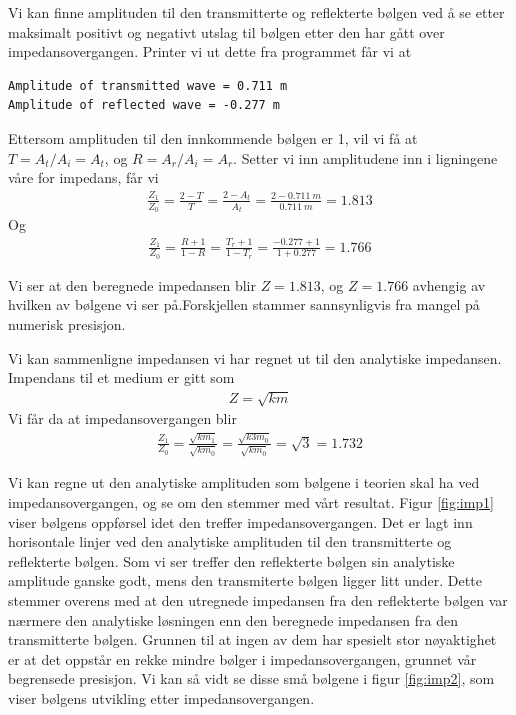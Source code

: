 \documentclass[12p,a4paper]{report}
\begin{document}
Vi kan finne amplituden til den transmitterte og reflekterte bølgen ved å se etter maksimalt positivt og negativt utslag til bølgen etter den har gått over impedansovergangen. Printer vi ut dette fra programmet får vi at
\begin{lstlisting}[frame=single]
Amplitude of transmitted wave = 0.711 m
Amplitude of reflected wave = -0.277 m
\end{lstlisting}
Ettersom amplituden til den innkommende bølgen er 1, vil vi få at $T = A_t/A_i = A_t$, og $R = A_r/A_i = A_r$.
Setter vi inn amplitudene inn i ligningene våre for impedans, får vi
\begin{align*}
\frac{Z_1}{Z_0} = \frac{2-T}{T} = \frac{2-A_t}{A_t} = \frac{2-\SI{0.711}{m}}{\SI{0.711}{m}} = 1.813
\end{align*}
Og
\begin{align*}
\frac{Z_1}{Z_0} = \frac{R+1}{1-R} = \frac{T_r+1}{1-T_r} = \frac{-0.277+1}{1+0.277} = 1.766
\end{align*}

Vi ser at den beregnede impedansen blir $Z = 1.813$, og $Z=1.766$ avhengig av hvilken av bølgene vi ser på.Forskjellen stammer sannsynligvis fra mangel på numerisk presisjon.

Vi kan sammenligne impedansen vi har regnet ut til den analytiske impedansen. Impendans til et medium er gitt som
\begin{align*}
Z = \sqrt{km}
\end{align*}
Vi får da at impedansovergangen blir
\begin{align*}
\frac{Z_1}{Z_0} = \frac{\sqrt{km_1}}{\sqrt{km_0}} = \frac{\sqrt{k3m_0}}{\sqrt{km_0}} = \sqrt{3} = 1.732
\end{align*}

Vi kan regne ut den analytiske amplituden som bølgene i teorien skal ha ved impedansovergangen, og se om den stemmer med vårt resultat. Figur \ref{fig:imp1} viser bølgens oppførsel idet den treffer impedansovergangen. Det er lagt inn horisontale linjer ved den analytiske amplituden til den transmitterte og reflekterte bølgen. Som vi ser treffer den reflekterte bølgen sin analytiske amplitude ganske godt, mens den transmiterte bølgen ligger litt under. Dette stemmer overens med at den utregnede impedansen fra den reflekterte bølgen var nærmere den analytiske løsningen enn den beregnede impedansen fra den transmitterte bølgen. Grunnen til at ingen av dem har spesielt stor nøyaktighet er at det oppstår en rekke mindre bølger i impedansovergangen, grunnet vår begrensede presisjon. Vi kan så vidt se disse små bølgene i figur \ref{fig:imp2}, som viser bølgens utvikling etter impedansovergangen.
\end{document}
